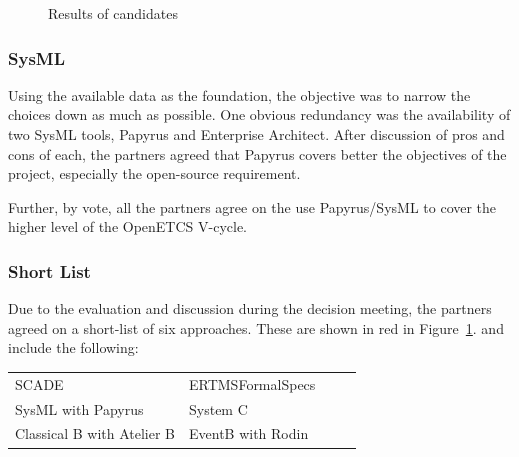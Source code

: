  \begin{figure}
  \centering
  \caption{Results of candidates}
  \label{fig:results}
\end{figure}

\subsubsection{SysML}

Using the available data as the foundation, the objective was to narrow the choices down as much as possible.  One obvious redundancy was the availability of two SysML tools, Papyrus and Enterprise Architect. After discussion of pros and cons of each, the partners agreed that Papyrus covers better the objectives of the project, especially the open-source requirement. 

Further, by vote, all the partners agree on the use Papyrus/SysML to cover the higher level of the  OpenETCS V-cycle.

\subsubsection{Short List}

Due to the evaluation and discussion during the decision meeting, the partners agreed on a short-list of six approaches. These are shown in red in Figure~\ref{fig:results}. and include the following:

\begin{tabular}{ p{0.5\linewidth} p{0.5\linewidth} }
SCADE & ERTMSFormalSpecs \\
SysML with Papyrus & System C \\
Classical B with Atelier B & EventB with Rodin
\end{tabular}

